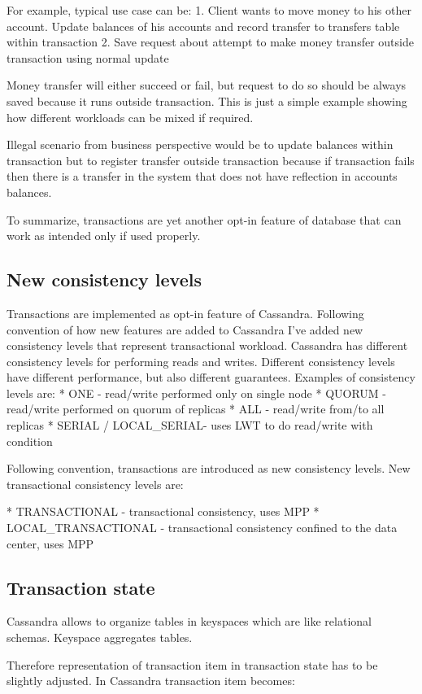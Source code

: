 For example, typical use case can be:
1. Client wants to move money to his other account.  Update balances of his accounts and record transfer to transfers table within transaction
2. Save request about attempt to make money transfer outside transaction using normal update


Money transfer will either succeed or fail, but request to do so should be always saved because it runs outside transaction. This is just a simple example showing how different workloads can be mixed if required. 


Illegal scenario from business perspective would be to update balances within transaction but to register transfer outside transaction because if transaction fails then there is a transfer in the system that does not have reflection in accounts balances. 


To summarize, transactions are yet another opt-in feature of database that can work as intended only if used properly. 


\subsection{New consistency levels}
Transactions are implemented as opt-in feature of Cassandra. Following convention of how new features are added to Cassandra I’ve added new consistency levels that represent transactional workload.
Cassandra has different consistency levels for performing reads and writes. Different consistency levels have different performance, but also different guarantees. Examples of consistency levels are:
* ONE - read/write performed only on single node
* QUORUM - read/write performed on quorum of replicas
* ALL - read/write from/to all replicas
* SERIAL / LOCAL_SERIAL- uses LWT to do read/write with condition


Following convention, transactions are introduced as new consistency levels. New transactional consistency levels are:


* TRANSACTIONAL - transactional consistency, uses MPP
* LOCAL_TRANSACTIONAL - transactional consistency confined to the data center, uses MPP


\subsection{Transaction state}
Cassandra allows to organize tables in keyspaces which are like relational schemas. Keyspace aggregates tables. 


Therefore representation of transaction item in transaction state has to be slightly adjusted. In Cassandra transaction item becomes:


